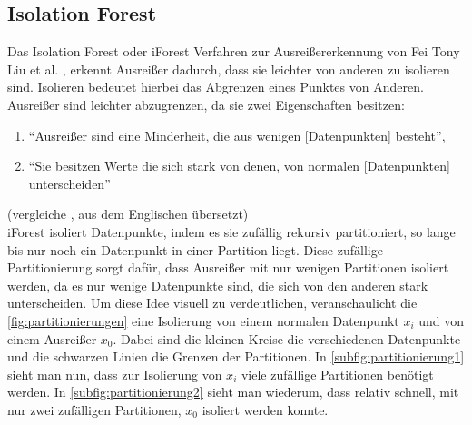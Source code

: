 \subsection{Isolation Forest}
Das Isolation Forest oder iForest Verfahren zur Ausreißererkennung von Fei Tony Liu et al. \cite{iForest}, erkennt Ausreißer dadurch, dass sie leichter von anderen zu isolieren sind. Isolieren bedeutet hierbei das Abgrenzen eines Punktes von Anderen. Ausreißer sind leichter abzugrenzen, da sie zwei Eigenschaften besitzen:
\begin{enumerate}
    \item "`Ausreißer sind eine Minderheit, die aus wenigen [Datenpunkten] besteht"',
    \item "`Sie besitzen Werte die sich stark von denen, von normalen [Datenpunkten] unterscheiden"'
\end{enumerate}
(vergleiche \cite[Ch. 1]{iForest}, aus dem Englischen übersetzt) \\
iForest isoliert Datenpunkte, indem es sie zufällig rekursiv partitioniert, so lange bis nur noch ein Datenpunkt in einer Partition liegt. Diese zufällige Partitionierung sorgt dafür, dass Ausreißer mit nur wenigen Partitionen isoliert werden, da es nur wenige Datenpunkte sind, die sich von den anderen stark unterscheiden. Um diese Idee visuell zu verdeutlichen, veranschaulicht die \autoref{fig:partitionierungen} eine Isolierung von einem normalen Datenpunkt $x_i$ und von einem Ausreißer $x_0$. Dabei sind die kleinen Kreise die verschiedenen Datenpunkte und die schwarzen Linien die Grenzen der Partitionen. In \autoref{subfig:partitionierung1} sieht man nun, dass zur Isolierung von $x_i$ viele zufällige Partitionen benötigt werden. In \autoref{subfig:partitionierung2} sieht man wiederum, dass relativ schnell, mit nur zwei zufälligen Partitionen, $x_0$ isoliert werden konnte.
